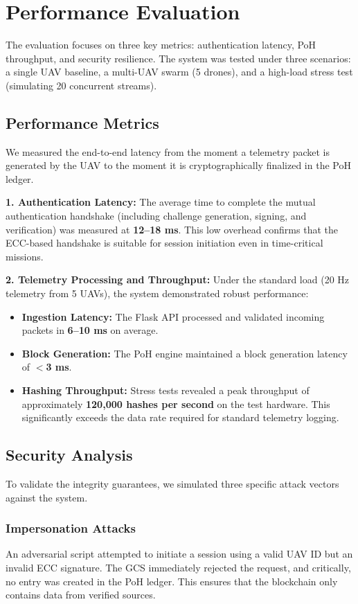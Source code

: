 \documentclass[preprint,12pt]{elsarticle}
\begin{document}
\section{Performance Evaluation}

The evaluation focuses on three key metrics: authentication latency, PoH throughput, and security resilience. The system was tested under three scenarios: a single UAV baseline, a multi-UAV swarm (5 drones), and a high-load stress test (simulating 20 concurrent streams).

\subsection{Performance Metrics}
We measured the end-to-end latency from the moment a telemetry packet is generated by the UAV to the moment it is cryptographically finalized in the PoH ledger.

\textbf{1. Authentication Latency:}
The average time to complete the mutual authentication handshake (including challenge generation, signing, and verification) was measured at \textbf{12--18 ms}. This low overhead confirms that the ECC-based handshake is suitable for session initiation even in time-critical missions.

\textbf{2. Telemetry Processing and Throughput:}
Under the standard load (20 Hz telemetry from 5 UAVs), the system demonstrated robust performance:
\begin{itemize}
    \item \textbf{Ingestion Latency:} The Flask API processed and validated incoming packets in \textbf{6--10 ms} on average.
    \item \textbf{Block Generation:} The PoH engine maintained a block generation latency of \textbf{$<$3 ms}.
    \item \textbf{Hashing Throughput:} Stress tests revealed a peak throughput of approximately \textbf{120,000 hashes per second} on the test hardware. This significantly exceeds the data rate required for standard telemetry logging.
\end{itemize}

\subsection{Security Analysis}
To validate the integrity guarantees, we simulated three specific attack vectors against the system.

\subsubsection{Impersonation Attacks}
An adversarial script attempted to initiate a session using a valid UAV ID but an invalid ECC signature. The GCS immediately rejected the request, and critically, no entry was created in the PoH ledger. This ensures that the blockchain only contains data from verified sources.
\end{document}
